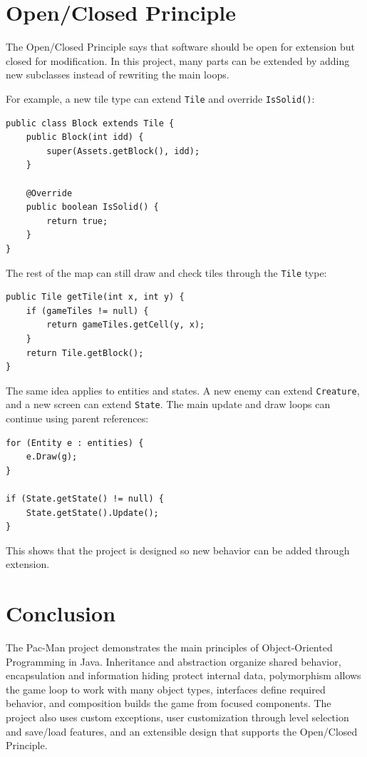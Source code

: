 \documentclass[12pt,a4paper]{article}
\begin{document}
\section{Open/Closed Principle}

The Open/Closed Principle says that software should be open for extension but closed for modification. In this project, many parts can be extended by adding new subclasses instead of rewriting the main loops.

For example, a new tile type can extend \texttt{Tile} and override \texttt{IsSolid()}:

\begin{lstlisting}
public class Block extends Tile {
    public Block(int idd) {
        super(Assets.getBlock(), idd);
    }

    @Override
    public boolean IsSolid() {
        return true;
    }
}
\end{lstlisting}

The rest of the map can still draw and check tiles through the \texttt{Tile} type:

\begin{lstlisting}
public Tile getTile(int x, int y) {
    if (gameTiles != null) {
        return gameTiles.getCell(y, x);
    }
    return Tile.getBlock();
}
\end{lstlisting}

The same idea applies to entities and states. A new enemy can extend \texttt{Creature}, and a new screen can extend \texttt{State}. The main update and draw loops can continue using parent references:

\begin{lstlisting}
for (Entity e : entities) {
    e.Draw(g);
}

if (State.getState() != null) {
    State.getState().Update();
}
\end{lstlisting}

This shows that the project is designed so new behavior can be added through extension.

\section{Conclusion}

The Pac-Man project demonstrates the main principles of Object-Oriented Programming in Java. Inheritance and abstraction organize shared behavior, encapsulation and information hiding protect internal data, polymorphism allows the game loop to work with many object types, interfaces define required behavior, and composition builds the game from focused components. The project also uses custom exceptions, user customization through level selection and save/load features, and an extensible design that supports the Open/Closed Principle.
\end{document}
